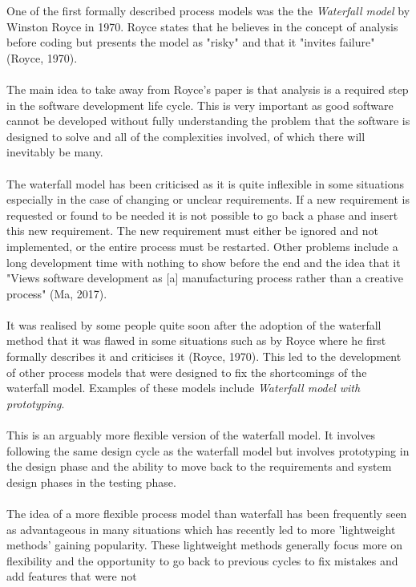 \documentclass{CRPITStyle}
\begin{document}
		One of the first formally described process models was the the \textit{Waterfall model} by Winston Royce in 1970.
		Royce states that he believes in the concept of analysis before coding but presents the model as "risky" and that it
		"invites failure" (Royce, 1970).\\
		~\\
		The main idea to take away from Royce's paper is that analysis is a required step in the software development life cycle.
		This is very important as good software cannot be developed without fully understanding the problem that the software
		is designed to solve and all of the complexities involved, of which there will inevitably be many.\\
		~\\
		The waterfall model has been criticised as it is quite inflexible in some situations especially in the case of changing
		or unclear requirements. If a new requirement is requested or found to be needed it is not possible to go back a phase
		and insert this new requirement. The new requirement must either be ignored and not implemented, or the entire
		process must be restarted. Other problems include a long development time with nothing to show before the end and
		the idea that it "Views software development as [a] manufacturing process rather than a creative process" (Ma, 2017).\\
		~\\
		It was realised by some people quite soon after the adoption of the waterfall method that it was flawed in some 
		situations such as by Royce where he first formally describes it and criticises it (Royce, 1970). This led to the
		development of other process models that were designed to fix the shortcomings of the waterfall model. Examples of
		these models include \textit{Waterfall model with prototyping}. \\
		~\\
		 This is an arguably more flexible version of the waterfall model. It involves following the same
		 design cycle as the waterfall model but involves prototyping in the design phase
		and the ability to move back to the requirements and system design phases in the testing phase.\\
		~\\
		The idea of a more flexible process model than waterfall has been frequently seen as advantageous in many situations
		which has recently led to more 'lightweight methods' gaining popularity. These lightweight methods generally focus 
		more on flexibility and the opportunity to go back to previous cycles to fix mistakes and add features that were not
\end{document}
